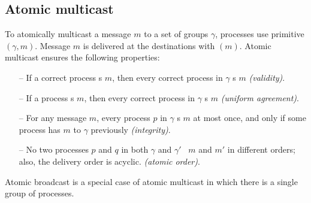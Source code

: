 \subsection{Atomic multicast}
\label{sec:amcast}

To atomically multicast a message $m$ to a set of groups $\gamma$, processes use primitive \amcast$(\gamma, m)$.
Message $m$ is delivered at the destinations with \amdel$(m)$.
Atomic multicast ensures the following properties:

\begin{itemize}
    
    \item[--] If a correct process \amcast{}s $m$, then every correct process in $\gamma$ \amdel{}s $m$ \emph{(validity)}.
    
    \item[--] If a process \amdel{}s $m$, then every correct process in $\gamma$ \amdel{}s $m$ \emph{(uniform agreement)}.
    
    \item[--] For any message $m$, every process $p$ in $\gamma$ \amdel{}s $m$ at most once, and only if some process has \amcast{} $m$ to $\gamma$ previously \emph{(integrity)}.
    
    \item[--] No two processes $p$ and $q$ in both $\gamma$ and $\gamma'$ \amdel\ $m$ and $m'$ in different orders; also, the delivery order is acyclic. \emph{(atomic order)}.
    
\end{itemize}

Atomic broadcast is a special case of atomic multicast in which there is a single group of processes.